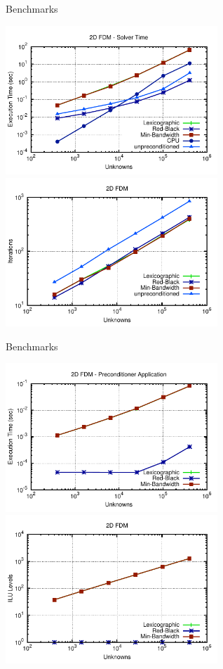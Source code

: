\begin{frame}{Benchmarks}
  \begin{center}
   \vspace*{-0.4cm}
   \includegraphics[width=0.60\textwidth]{figures/fdm2d-solver.pdf} \\[-0.2em]
   \includegraphics[width=0.60\textwidth]{figures/fdm2d-iters.pdf}
  \end{center}
\end{frame}

\begin{frame}{Benchmarks}
  \begin{center}
   \vspace*{-0.4cm}
   \includegraphics[width=0.60\textwidth]{figures/fdm2d-precond.pdf} \\[-0.2em]
   \includegraphics[width=0.60\textwidth]{figures/fdm2d-levels.pdf}
  \end{center}
\end{frame}


